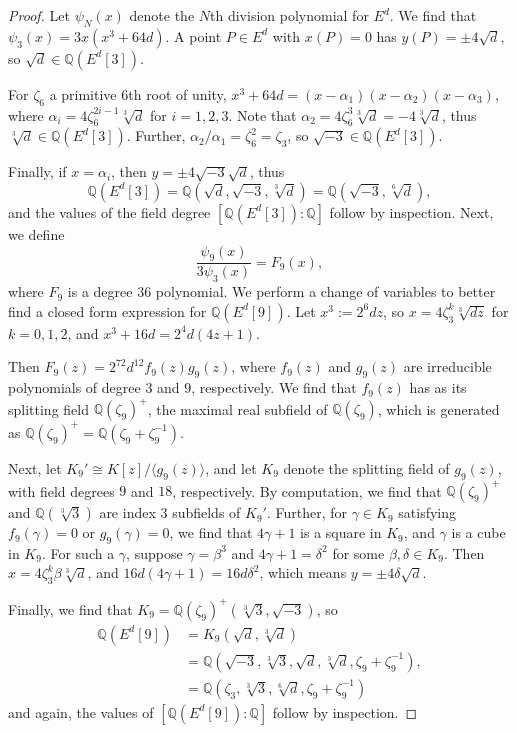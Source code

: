 \documentclass[11pt]{amsart}
\theoremstyle{definition}
\newcommand{\Q}{\mathbb Q}
\begin{document}
\begin{proof}
Let $\psi_{N}(x)$ denote the $N$th division polynomial for $E^d$. We find that $\psi_3(x) = 3x(x^3 + 64d)$. A point $P\in E^d$ with $x(P) = 0$ has $y(P) = \pm 4 \sqrt{d}$, so $\sqrt{d} \in \Q(E^d[3]).$

For $\zeta_6$ a primitive $6$th root of unity, $x^3 + 64d = (x-\alpha_1)(x - \alpha_2)(x - \alpha_3)$, where $\alpha_i = 4 \zeta_6^{2i - 1} \sqrt[3]{d}$ for $i = 1, 2, 3$.
Note that $\alpha_2 = 4 \zeta_6^{3} \sqrt[3]{d} = -4\sqrt[3]{d}$, thus $\sqrt[3]{d} \in \Q(E^d[3])$.
Further, $\alpha_2/\alpha_1 = \zeta_6^2 = \zeta_3$, so $\sqrt{-3} \in \Q(E^d[3])$.

Finally, if $x = \alpha_i$, then $y = \pm 4 \sqrt{-3} \sqrt{d}$, thus 
\[ \Q(E^d[3]) = \Q(\sqrt{d},\sqrt{-3},\sqrt[3]{d}) = \Q(\sqrt{-3}, \sqrt[6]{d}),\]
and the values of the field degree $[\Q(E^d[3]) : \Q]$ follow by inspection. Next, we define
\[ \frac{\psi_9(x)}{3 \psi_3(x)} = F_9(x),\]
where $F_9$ is a degree $36$ polynomial. We perform a change of variables to better find a closed form expression for $\Q(E^{d}[9])$. Let $x^3 := 2^6 d z$, so $x = 4 \zeta_3^k \sqrt[3]{dz}$ for $k = 0, 1, 2$, and $x^3 + 16d = 2^4 d (4z + 1)$.

Then $F_9(z) = 2^{72} d^{12} f_9(z) g_9(z)$, where $f_9(z)$ and $g_9(z)$ are irreducible polynomials of degree $3$ and $9$, respectively. We find that $f_9(z)$ has as its splitting field $\Q(\zeta_9)^{+}$, the maximal real subfield of $\Q(\zeta_9)$, which is generated as $\Q(\zeta_9)^{+} = \Q(\zeta_9 + \zeta_9^{-1})$.

Next, let $K_9' \cong K[z]/\langle g_9(z) \rangle$, and let $K_9$ denote the splitting field of $g_9(z)$, with field degrees $9$ and $18$, respectively. By computation, we find that $\Q(\zeta_9)^{+}$ and $\Q(\sqrt[3]{3})$ are index 3 subfields of $K_9'$. Further, for $\gamma \in K_9$ satisfying $f_9(\gamma) = 0$ or $g_9(\gamma) = 0$, we find that $4\gamma + 1$ is a square in $K_9$, and $\gamma$ is a cube in $K_9$. For such a $\gamma$, suppose $\gamma = \beta^3$ and $4 \gamma + 1 = \delta^2$ for some $\beta, \delta \in K_9$. Then $x = 4 \zeta_3^k \beta \sqrt[3]{d}$, and $16d(4\gamma + 1) = 16d\delta^2$, which means $y = \pm 4 \delta \sqrt{d}$.

Finally, we find that $K_9 = \Q(\zeta_9)^{+}(\sqrt[3]{3}, \sqrt{-3})$, so
\begin{align*}
\Q(E^d[9])
&= K_9(\sqrt{d}, \sqrt[3]{d}) \\
&= \Q(\sqrt{-3}, \sqrt[3]{3}, \sqrt{d}, \sqrt[3]{d}, \zeta_9 + \zeta_9^{-1}),\\
&= \Q(\zeta_3, \sqrt[3]{3}, \sqrt[6]{d}, \zeta_9 + \zeta_9^{-1})
\end{align*}
and again, the values of $[\Q(E^d[9]) : \Q]$ follow by inspection. 
\end{proof}
\end{document}
